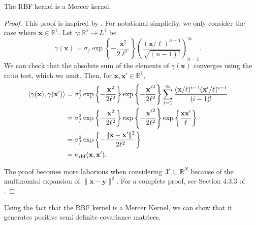 \begin{theorem}
    \label{thm:rbf-mercer}
    The RBF kernel is a Mercer kernel.
\end{theorem}
\begin{proof}
    This proof is inspired by \cite{shashua2009}.
    For notational simplicity, we only consider the case where $\mathbf{x} \in \mathbb{R}^{1}$.
    Let $\gamma : \mathbb{R}^{1} \to L^1$ be
    \begin{equation*}
        \gamma(\mathbf{x}) = \sigma_f \exp\left\{- \frac{\mathbf{x}^2}{2\ell^2}\right\} \left(\frac{ (\mathbf{x} / \ell)^{n - 1} }{ \sqrt{(n - 1)!} }\right)_{n=1}^{\infty}.
    \end{equation*}
    We can check that the absolute sum of the elements of $\gamma(\mathbf{x})$ converges using the ratio test, which we omit.
    Then, for $\mathbf{x}, \mathbf{x'} \in \mathbb{R}^{1}$,
    \begin{align*}
        \langle \gamma(\mathbf{x}), \gamma(\mathbf{x'}) \rangle
        & = \sigma_f^2
        \exp \left\{ -\frac{\mathbf{x}^2}{2\ell^2} \right\}
        \exp \left\{ -\frac{ \mathbf{x'}^2}{2\ell^2} \right\}
        \sum\limits_{i=1}^{\infty}
        \frac{ (\mathbf{x}/\ell)^{i - 1} (\mathbf{x'}/\ell)^{i - 1}}{ (i - 1)! } \\
        & = \sigma_f^2
        \exp \left\{ -\frac{ \mathbf{x}^2}{2\ell^2} \right\}
        \exp \left\{ -\frac{ \mathbf{x'}^2}{2\ell^2} \right\}
        \exp \left\{ \frac{\mathbf{x} \mathbf{x'}}{ \ell} \right\} \\
        & = \sigma_f^2 \exp \left\{ -\frac{ \lVert \mathbf{x} - \mathbf{x'} \rVert^2 }{ 2\ell^2 } \right\} \\
        & = \kappa_{\mathrm{rbf}}(\mathbf{x}, \mathbf{x'}).
    \end{align*}

    The proof becomes more laborious when considering $\mathcal{X} \subseteq \mathbb{R}^{N}$ because of the multinomial expansion of $\lVert \mathbf{x} - \mathbf{y} \rVert^2$.
    For a complete proof, see Section 4.3.3 of \cite{shashua2009}.
\end{proof}

Using the fact that the RBF kernel is a Mercer Kernel, we can show that it generates positive semi definite covariance matrices.

